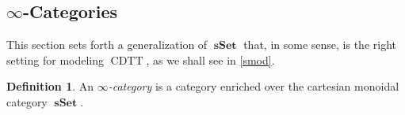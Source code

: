 \documentclass[10pt,letterpaper,cm]{nupset}
\theoremstyle{definition}
\newtheorem{definition}{Definition}[subsection]
\theoremstyle{theorem}
\newtheorem{prop}[definition]{Proposition}
\theoremstyle{remark}
\DeclareMathOperator{\mor}{Mor}
\newcommand{\0}{\mathbf{0}}
\newcommand{\1}{\mathbf{1}}
\newcommand{\2}{\mathbf{2}}
\DeclareMathOperator{\cdtt}{\mathrm{CDTT}}
\DeclareMathOperator{\sset}{\mathbf{sSet}}
\renewcommand{\c}{\mathscr{C}}
\DeclareMathOperator{\fib}{\mathnormal{Fib}}
\DeclareMathOperator{\cof}{\mathnormal{Cof}}
\DeclareMathOperator{\we}{\mathnormal{W}}
\newcommand{\be}{\begin{enumerate}}
\newcommand{\ee}{\end{enumerate}}
\begin{document}
\subsection{$\infty$-Categories}\label{highcat}

This section sets forth a  generalization of $\sset$ that, in some sense, is the right setting for modeling $\cdtt$, as we shall see 
in \cref{smod}.

\medskip

\begin{comment}
\begin{definition} Let $\c$ be a category and let $J$ be a subclass of $\mor(\c)$.
\be
\item We say that $J$ satisfies \textit{two-out-of-six} if for any three composable maps
\[
A \overset{f}{\longrightarrow} B \overset{g}{\longrightarrow} C \overset{h}{\longrightarrow} D
\] in $J$, whenever both $h \circ g$ and $g\circ f$ are in $J$, so are $f$, $g$, $h$, and $h \circ g \circ f$.
\item We say that $\c$ is a \textit{homotopical category} if it has a distinguished class $\we$ of morphisms (called \textit{weak equivalences}) that both contains all isomorphisms and satisfies two-out-of-six.
\ee
\end{definition}

\begin{prop}
If $\mleft(\c, \fib, \cof, \we\mright)$ is a model category, then $\mleft(\c, \we\mright)$ is a homotopical category.\footnote{See \cite{MSER}.}
\end{prop}

Moreover, it is clear that every homotopical category is a category with weak equivalences. Therefore, the notion of homotopical category  is intermediate between \textit{category with weak equivalences} and \textit{model category}.

\smallskip
\end{comment}

\begin{definition}
An  \textit{$\infty$-category} is a category  enriched over the cartesian monoidal category $\sset$.
\end{definition}
\end{document}
